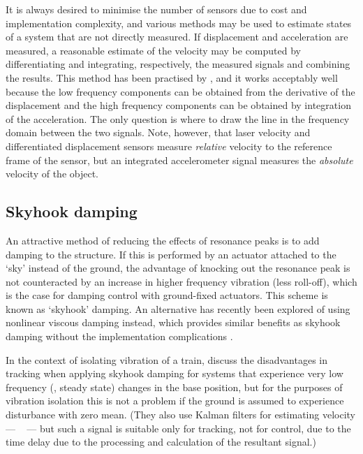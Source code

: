 It is always desired to minimise the number of sensors due to cost and
implementation complexity, and various methods may be used to estimate
states of a system that are not directly measured.
If displacement and
acceleration are measured, a reasonable estimate of the velocity may
be computed by differentiating and integrating, respectively, the
measured signals and combining the results.
This method has been practised by \textcite{bennett2007}, and it works acceptably well because the low frequency components can be obtained from the derivative of the displacement and the high frequency components can be obtained by integration of the acceleration.
The only question is where to draw the line in the frequency domain between the two signals.
Note, however, that laser velocity and differentiated displacement sensors measure \emph{relative} velocity to the reference frame of the sensor, but an integrated accelerometer signal measures the \emph{absolute} velocity of the object.




\subsection{Skyhook damping}

An attractive method of reducing the effects of resonance peaks is to add
damping to the structure.
If this is performed by an actuator attached to the
`sky' instead of the ground, the advantage of knocking out the resonance peak
is not counteracted by an increase in higher frequency vibration (less
roll-off), which is the case for damping control with ground-fixed actuators.
This scheme is known as `skyhook' damping.
An alternative has recently been explored of using nonlinear viscous damping instead, which provides similar benefits as skyhook damping without the implementation complications \cite{lang2009}.

In the context of isolating vibration of a train, \textcite{li1999} discuss the disadvantages in tracking when applying skyhook damping for systems that experience very low frequency (\ie, steady state) changes in the base position, but for the purposes of vibration isolation this is not a problem if the ground is assumed to experience disturbance with zero mean.
(They also use Kalman filters for estimating velocity — \cf\  — but such a signal is suitable only for tracking, not for control, due to the time delay due to the processing and calculation of the resultant signal.)

